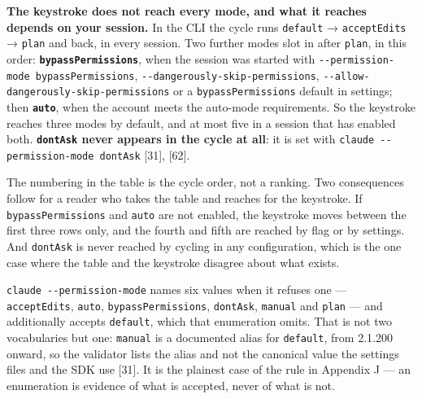 \documentclass[11pt,a4paper,twoside,openany]{book}
\begin{document}
\else
  \noindent\tblbody
\fi
\par\addvspace{2.6mm}
\endgroup

\textbf{The keystroke does not reach every mode, and what it reaches depends on your session.} In the CLI the cycle runs \texttt{default} → \texttt{accept\allowbreak{}Edits} → \texttt{plan} and back, in every session. Two further modes slot in after \texttt{plan}, in this order: \textbf{\texttt{bypass\allowbreak{}Permissions}}, when the session was started with \texttt{-\allowbreak{}-\allowbreak{}permission-\allowbreak{}mode bypass\allowbreak{}Permissions}, \texttt{-\allowbreak{}-\allowbreak{}dangerously-\allowbreak{}skip-\allowbreak{}permissions}, \texttt{-\allowbreak{}-\allowbreak{}allow-\allowbreak{}dangerously-\allowbreak{}skip-\allowbreak{}permissions} or a \texttt{bypass\allowbreak{}Permissions} default in settings; then \textbf{\texttt{auto}}, when the account meets the auto-mode requirements. So the keystroke reaches three modes by default, and at most five in a session that has enabled both. \textbf{\texttt{dont\allowbreak{}Ask} never appears in the cycle at all}: it is set with \texttt{claude -\allowbreak{}-\allowbreak{}permission-\allowbreak{}mode dont\allowbreak{}Ask} [31], [62].


The numbering in the table is the cycle order, not a ranking. Two consequences follow for a reader who takes the table and reaches for the keystroke. If \texttt{bypass\allowbreak{}Permissions} and \texttt{auto} are not enabled, the keystroke moves between the first three rows only, and the fourth and fifth are reached by flag or by settings. And \texttt{dont\allowbreak{}Ask} is never reached by cycling in any configuration, which is the one case where the table and the keystroke disagree about what exists.


\texttt{claude -\allowbreak{}-\allowbreak{}permission-\allowbreak{}mode} names six values when it refuses one — \texttt{accept\allowbreak{}Edits}, \texttt{auto}, \texttt{bypass\allowbreak{}Permissions}, \texttt{dont\allowbreak{}Ask}, \texttt{manual} and \texttt{plan} — and additionally accepts \texttt{default}, which that enumeration omits. That is not two vocabularies but one: \texttt{manual} is a documented alias for \texttt{default}, from 2.1.200 onward, so the validator lists the alias and not the canonical value the settings files and the SDK use [31]. It is the plainest case of the rule in Appendix J — an enumeration is evidence of what is accepted, never of what is not.
\end{document}
